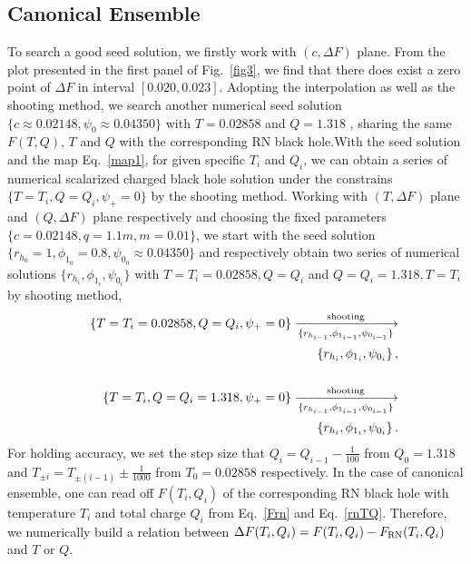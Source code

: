 \documentclass[pr, twocolumn, preprintnumbers, showpacs,footnoteadded, superscriptaddress,nofootinbib,longbibliography]{revtex4-1}
\begin{document}
\subsection{Canonical Ensemble}\label{canapp}
To search a good seed solution, we firstly work with $(c, \Delta F )$ plane. From the plot presented in the first panel of Fig.~\ref{fig3}, we find that there does exist a zero point of $\Delta F$ in interval $[0.020, 0.023]$. Adopting the interpolation as well as the shooting method, we search another numerical seed solution $\{c \approx 0.02148, \psi_0 \approx0.04350 \}$ with $T=0.02858$ and $Q=1.318$ , sharing the same $F(T,Q)$, $T$ and $Q$ with the corresponding RN black hole.With the seed solution and the map Eq.~\eqref{map1}, for given specific $T_i$ and $Q_i$, we can obtain a series of numerical scalarized charged black hole solution under the constrains $\{T=T_i, Q=Q_i, \psi_+=0\}$ by the shooting method. Working with $(T, \Delta F)$ plane and $(Q, \Delta F)$ plane respectively and choosing the fixed parameters $\{c=0.02148, q=1.1m, m=0.01\}$, we start with the seed solution $\{r_{h_0}=1, \phi_{1_0}=0.8, \psi_{0_0} \approx 0.04350 \}$ and respectively obtain two series of numerical solutions $\{r_{h_i}, \phi_{1_i}, \psi_{0_i}\}$ with $T=T_i=0.02858, Q=Q_i$ and $Q=Q_i=1.318,T=T_i$ by shooting method,
%
\begin{eqnarray}
&& \{T=T_i = 0.02858, Q=Q_i ,\psi_+=0 \}   \xrightarrow[\{r_{h_{i-1}}, \phi_{1_{i-1}}, \psi_{0_{i-1}} \}]{\text{shooting}} \cr
&&\{r_{h_{i}}, \phi_{1_{i}}, \psi_{0_{i}} \}\, ,  \\
~\cr
&& \{T=T_i, Q=Q_i=1.318 ,\psi_+=0 \}   \xrightarrow[\{r_{h_{i-1}}, \phi_{1_{i-1}}, \psi_{0_{i-1}} \}]{\text{shooting}}  \cr
&& \{r_{h_{i}}, \phi_{1_{i}}, \psi_{0_{i}} \}\, .
\end{eqnarray}
%
For holding accuracy, we set the step size that $Q_{i}=Q_{i-1}-\frac{1}{100}$ from $Q_0=1.318$ and $T_{\pm i}=T_{\pm(i-1)}\pm \frac{1}{1000}$ from $ T_0=0.02858$ respectively. In the case of canonical ensemble, one can read off $F(T_i,Q_i)$ of the corresponding RN black hole with temperature $T_i$ and total charge $Q_i$ from Eq.~\eqref{Frn} and Eq.~\eqref{rnTQ}. Therefore, we numerically build a relation between $\Delta F (T_i, Q_i) = F(T_i, Q_i)- F_{\rm RN}(T_i, Q_i)$ and $T$ or $Q$.
~\\
\end{document}
